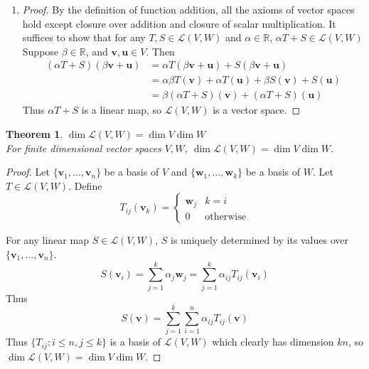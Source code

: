 \documentclass[12pt]{article}
\newtheorem{thm}{Theorem}[section] %
\theoremstyle{plain}
\newcommand{\R}{\mathbb{R}}
\newcommand{\vv}{\mathbf{v}}
\newcommand{\vu}{\mathbf{u}}
\newcommand{\vw}{\mathbf{w}}
\newcommand{\Lagr}{\mathcal{L}}
\begin{document}
\begin{enumerate}
\begin{proof}
\begin{align*}
                &= T\sum_{i = 1}^n \alpha_i \vv_i\\
                &= T\vv
            \end{align*}
            Thus for all $\vv \in V$, $S\vv = T\vv$, so $S = T$. Hence, linear maps are uniquely determined by the image of a basis of the domain.
        \end{proof}
        \item \begin{proof}
            By the definition of function addition, all the axioms of vector spaces hold except closure over addition and closure of scalar multiplication. It suffices to show that for any $T, S \in \Lagr(V, W)$ and $\alpha \in \R$, $\alpha T + S \in \Lagr(V,W)$
            Suppose $\beta \in \R$, and $\vv, \vu \in V$. Then 
            \begin{align}
                (\alpha T + S)(\beta \vv + \vu) &= \alpha T(\beta \vv + \vu) + S(\beta \vv + \vu)\\
                &= \alpha \beta T(\vv) + \alpha T(\vu) + \beta S(\vv) + S(\vu)\\
                &= \beta (\alpha T + S)(\vv) + (\alpha T + S)(\vu)
            \end{align}
            Thus $\alpha T + S$ is a linear map, so $\Lagr(V,W)$ is a vector space.
        \end{proof}
    \end{enumerate}
    

    \begin{thm}{$\dim \Lagr(V,W) = \dim V \dim W$}
        ~\\For finite dimensional vector spaces $V, W$, $\dim \Lagr(V,W) = \dim V \dim W$.
    \end{thm}
    \begin{proof}
        Let $\{\vv_1, \dots, \vv_n\}$ be a basis of $V$ and $\{\vw_1, \dots, \vw_k\}$ be a basis of $W$. Let $T \in \Lagr(V, W)$. Define
        \[ T_{ij}(\vv_k) =
        \begin{cases} 
            \vw_j & k = i \\
            0 & \text{otherwise}
        \end{cases}
        \]

        For any linear map $S \in \Lagr(V,W)$, $S$ is uniquely determined by its values over $\{\vv_1, \dots, \vv_n\}$. 
        $$S(\vv_i) = \sum_{j=1}^k \alpha_j \vw_j = \sum_{j=1}^k \alpha_{ij} T_{ij}(\vv_i)$$Thus $$S(\vv) = \sum_{j=1}^k \sum_{i=1}^n \alpha_{ij} T_{ij}(\vv)$$Thus $\{T_{ij}: i \le n, j \le k\}$ is a basis of $\Lagr(V,W)$ which clearly has dimension $kn$, so $\dim \Lagr(V,W) = \dim V \dim W$.
    \end{proof}
\end{document}
